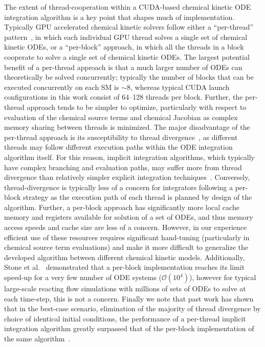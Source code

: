 \documentclass[final,twocolumn]{elsarticle}
\begin{document}
The extent of thread-cooperation within a CUDA-based chemical kinetic ODE integration algorithm is a key point that shapes much of implementation.
Typically GPU accelerated chemical kinetic solvers follow either a ``per-thread'' pattern~\cite{Niemeyer:2011aa,Stone:2013aa,Niemeyer:2014aa}, in which each individual GPU thread solves a single set of chemical kinetic ODEs, or a ``per-block'' approach\cite{Stone:2013aa,Sewerin20151375}, in which all the threads in a block cooperate to solve a single set of chemical kinetic ODEs.
The largest potential benefit of a per-thread approach is that a much larger number of ODEs can theoretically be solved concurrently; typically the number of blocks that can be executed concurrently on each SM is $\sim$8, whereas typical CUDA launch configurations in this work consist of 64--128 threads per block.
Further, the per-thread approach tends to be simpler to optimize, particularly with respect to evaluation of the chemical source terms and chemical Jacobian as complex memory sharing between threads is minimized.
The major disadvantage of the per-thread approach is its susceptibility to thread divergence~\cite{Stone:2013aa,Niemeyer:2014aa}, as different threads may follow different execution paths within the ODE integration algorithm itself.
For this reason, implicit integration algorithms, which typically have complex branching and evaluation paths, may suffer more from thread divergence than relatively simpler explicit integration techniques~\cite{Stone:2013aa}.
Conversely, thread-divergence is typically less of a concern for integrators following a per-block strategy as the execution path of each thread is planned by design of the algorithm.
Further, a per-block approach has significantly more local cache memory and registers available for solution of a set of ODEs, and thus memory access speeds and cache size are less of a concern.
However, in our experience efficient use of these resources requires significant hand-tuning (particularly in chemical source term evaluations) and make it more difficult to generalize the developed algorithm between different chemical kinetic models.
Additionally, Stone et al.~\cite{Stone:2013aa} demonstrated that a per-block implementation reaches its limit speed-up for a very few number of ODE systems ($\mathcal{O}(10^4)$), however for typical large-scale reacting flow simulations with millions of sets of ODEs to solve at each time-step, this is not a concern.
Finally we note that past work has shown that in the best-case scenario, elimination of the majority of thread divergence by choice of identical initial conditions, the performance of a per-thread implicit integration algorithm greatly surpassed that of the per-block implementation of the same algorithm~\cite{Stone:2013aa}.
\end{document}
